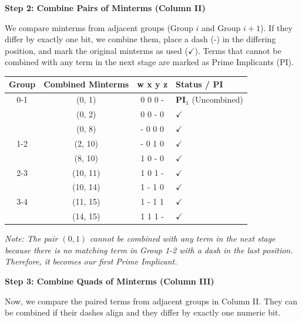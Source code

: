 \documentclass[12pt,a3paper]{article}
\begin{document}
\begin{enumerate}
\begin{tcolorbox}[enhanced,breakable,ansbox,colback=cC!4,colframe=cC,boxrule=0.8pt,arc=5pt,title={\textbf{Answer}},fonttitle=\bfseries\color{white},colbacktitle=cC]
\vspace{1em}
\textbf{\large Step 2: Combine Pairs of Minterms (Column II)}

We compare minterms from adjacent groups (Group $i$ and Group $i+1$). If they differ by exactly one bit, we combine them, place a dash (-) in the differing position, and mark the original minterms as used ($\checkmark$). Terms that cannot be combined with any term in the next stage are marked as Prime Implicants (PI).

\begin{center}
\begin{tabular}{cccl}
\toprule
\textbf{Group} & \textbf{Combined Minterms} & \textbf{w x y z} & \textbf{Status / PI} \\
\midrule
0-1 & (0, 1) & 0 0 0 - & \textcolor{cC}{\textbf{PI$_1$}} (Uncombined) \\
    & (0, 2) & 0 0 - 0 & $\checkmark$ \\
    & (0, 8) & - 0 0 0 & $\checkmark$ \\
\midrule
1-2 & (2, 10) & - 0 1 0 & $\checkmark$ \\
    & (8, 10) & 1 0 - 0 & $\checkmark$ \\
\midrule
2-3 & (10, 11) & 1 0 1 - & $\checkmark$ \\
    & (10, 14) & 1 - 1 0 & $\checkmark$ \\
\midrule
3-4 & (11, 15) & 1 - 1 1 & $\checkmark$ \\
    & (14, 15) & 1 1 1 - & $\checkmark$ \\
\bottomrule
\end{tabular}
\end{center}

\textit{Note: The pair $(0, 1)$ cannot be combined with any term in the next stage because there is no matching term in Group 1-2 with a dash in the last position. Therefore, it becomes our first Prime Implicant.}

\vspace{1em}
\textbf{\large Step 3: Combine Quads of Minterms (Column III)}

Now, we compare the paired terms from adjacent groups in Column II. They can be combined if their dashes align and they differ by exactly one numeric bit. 


\end{tcolorbox}
\end{enumerate}
\end{document}
